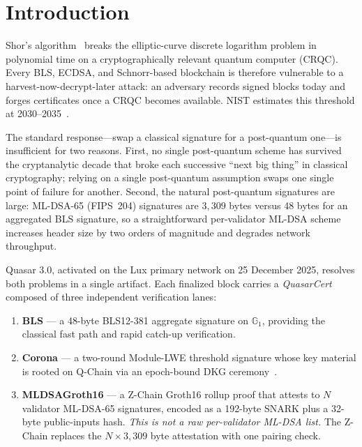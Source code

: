 \section{Introduction}

\label{sec:introduction}

Shor's algorithm~\cite{shor1994} breaks the elliptic-curve discrete logarithm
problem in polynomial time on a cryptographically relevant quantum computer
(CRQC). Every BLS, ECDSA, and Schnorr-based blockchain is therefore vulnerable
to a harvest-now-decrypt-later attack: an adversary records signed blocks
today and forges certificates once a CRQC becomes available. NIST estimates
this threshold at 2030--2035~\cite{mosca2018}.

The standard response---swap a classical signature for a post-quantum
one---is insufficient for two reasons. First, no single post-quantum scheme
has survived the cryptanalytic decade that broke each successive ``next big
thing'' in classical cryptography; relying on a single post-quantum
assumption swaps one single point of failure for another. Second, the natural
post-quantum signatures are large: ML-DSA-65 (FIPS~204) signatures are
$3{,}309$ bytes versus 48 bytes for an aggregated BLS signature, so a
straightforward per-validator ML-DSA scheme increases header size by two
orders of magnitude and degrades network throughput.

Quasar 3.0, activated on the Lux primary network on 25 December 2025,
resolves both problems in a single artifact. Each finalized block carries a
\emph{QuasarCert} composed of three independent verification lanes:

\begin{enumerate}[leftmargin=2em,label=\textbf{Lane \arabic*:}]
\item \textbf{BLS} --- a 48-byte BLS12-381 aggregate signature on
      $\mathbb{G}_1$, providing the classical fast path and rapid
      catch-up verification.
\item \textbf{Corona} --- a two-round Module-LWE threshold signature
      whose key material is rooted on Q-Chain via an epoch-bound DKG
      ceremony~\cite{corona}.
\item \textbf{MLDSAGroth16} --- a Z-Chain Groth16 rollup proof that attests
      to $N$ validator ML-DSA-65 signatures, encoded as a 192-byte SNARK
      plus a 32-byte public-inputs hash. \emph{This is not a raw
      per-validator ML-DSA list.} The Z-Chain replaces the $N \times 3{,}309$
      byte attestation with one pairing check.
\end{enumerate}

